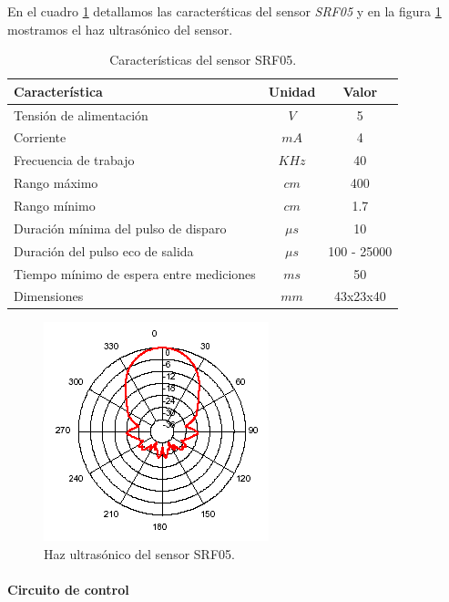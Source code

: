 En el cuadro \ref{hT_srf05} detallamos las caracter\'sticas del sensor \emph{SRF05} y en la figura \ref{hF_srf05} mostramos el haz ultras\'onico
del sensor.

\begin{table}[h]
	\begin{center}
		\begin{tabular}{|l|c|c|}
			\hline
			Caracter\'istica & Unidad & Valor\\
			\hline
			Tensi\'on de alimentaci\'on & $V$ & 5 \\
			Corriente & $mA$ & 4 \\
			Frecuencia de trabajo & $KHz$ & 40 \\
			Rango m\'aximo & $cm$ & 400 \\
			Rango m\'inimo & $cm$ & 1.7 \\
			Duraci\'on m\'inima del pulso de disparo & $\mu s$ & 10 \\
			Duraci\'on del pulso eco de salida & $\mu s$& 100 - 25000 \\
			Tiempo m\'inimo de espera entre mediciones & $m s$ & 50 \\
			Dimensiones & $mm$ & 43x23x40 \\
			\hline
		\end{tabular}
	\end{center}
	\caption{Caracter\'isticas del sensor SRF05.}
	\label{hT_srf05}
\end{table}

\begin{figure}[h]
	\centering
	\includegraphics[scale=0.5]{figuras/srf05_beam.png}
	\caption{Haz ultras\'onico del sensor SRF05.}
	\label{hF_srf05}
\end{figure}

\paragraph{Circuito de control}
\label{h_sensado_ultrasonido_circuito}


